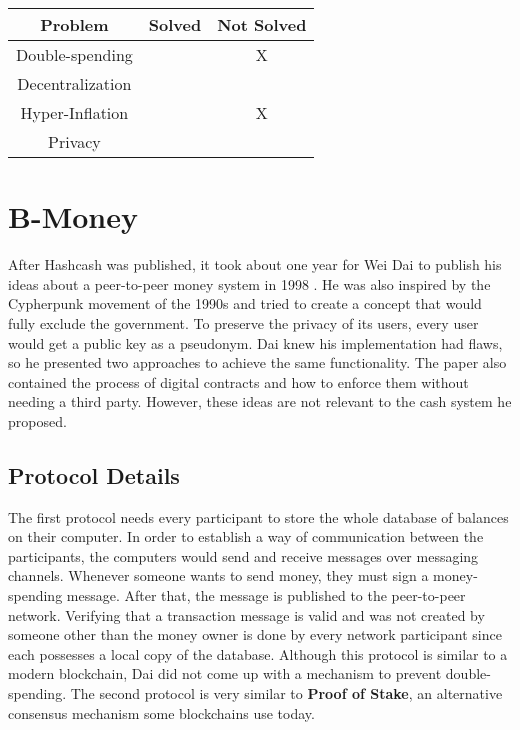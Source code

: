 \begin{center}
	\begin{tabular}{|c c c|} 
		\hline
		Problem & Solved & Not Solved \\ [0.5ex] 
		\hline
		Double-spending &  & X \\ [0.5ex]
		\hline
		Decentralization & \checkmark  & \\ [0.5ex]
		\hline
		Hyper-Inflation &  & X \\ [0.5ex]
		\hline
		Privacy & \checkmark &  \\ [0.5ex]
		\hline
	\end{tabular}
\end{center}

\section{B-Money}
After Hashcash was published, it took about one year for Wei Dai to publish his ideas about a peer-to-peer money system in 1998 \cite{dai1998}.
He was also inspired by the Cypherpunk movement of the 1990s and tried to create a concept that would fully exclude the government.
To preserve the privacy of its users, every user would get a public key as a pseudonym.
Dai knew his implementation had flaws, so he presented two approaches to achieve the same functionality.
The paper also contained the process of digital contracts and how to enforce them without needing a third party.
However, these ideas are not relevant to the cash system he proposed.

\subsection{Protocol Details}
The first protocol needs every participant to store the whole database of balances on their computer. 
In order to establish a way of communication between the participants, the computers would send and receive messages over messaging channels.
Whenever someone wants to send money, they must sign a money-spending message. After that, the message is published to the peer-to-peer network.
Verifying that a transaction message is valid and was not created by someone other than the money owner is done by every network participant since each possesses a local copy of the database.
Although this protocol is similar to a modern blockchain, Dai did not come up with a mechanism to prevent double-spending.
The second protocol is very similar to \textbf{Proof of Stake}, an alternative consensus mechanism some blockchains use today. \cite{wirdum_3_2018}

